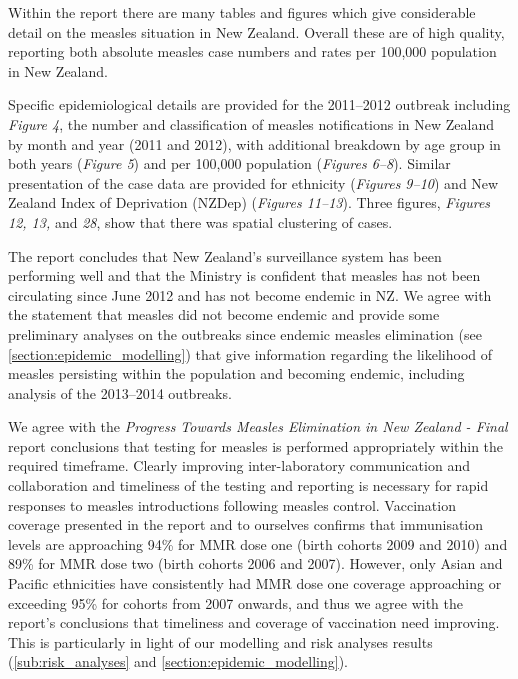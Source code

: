 \documentclass{article}
\begin{document}
Within the report there are many tables and figures which give considerable detail on the measles situation in New Zealand. Overall these are of high quality, reporting both absolute measles case numbers and rates per 100,000 population in New Zealand.

Specific epidemiological details are provided for the 2011--2012 outbreak including \emph{Figure 4}, the number and classification of measles notifications in New Zealand by month and year (2011 and 2012), with additional breakdown by age group in both years (\emph{Figure 5}) and per 100,000 population (\emph{Figures 6--8}). Similar presentation of the case data are provided for ethnicity (\emph{Figures 9--10}) and New Zealand Index of Deprivation (NZDep) (\emph{Figures 11--13}). Three figures, \emph{Figures 12, 13,} and \emph{28}, show that there was spatial clustering of cases.

The report concludes that New Zealand's surveillance system has been performing well and that the Ministry is confident that measles has not been circulating since June 2012 and has not become endemic in NZ. We agree with the statement that measles did not become endemic and provide some preliminary analyses on the outbreaks since endemic measles elimination (see \autoref{section:epidemic_modelling}) that give information regarding the likelihood of measles persisting within the population and becoming endemic, including analysis of the 2013--2014 outbreaks.

We agree with the \emph {Progress Towards Measles Elimination in New Zealand - Final} report conclusions that testing for measles is performed appropriately within the required timeframe. Clearly improving inter-laboratory communication and collaboration and timeliness of the testing and reporting is necessary for rapid responses to measles introductions following measles control. Vaccination coverage presented in the report and to ourselves confirms that immunisation levels are approaching 94\% for MMR dose one (birth cohorts 2009 and 2010) and 89\% for MMR dose two (birth cohorts 2006 and 2007). However, only Asian and Pacific ethnicities have consistently had MMR dose one coverage approaching or exceeding 95\% for cohorts from 2007 onwards, and thus we agree with the report's conclusions that timeliness and coverage of vaccination need improving. This is particularly in light of our modelling and risk analyses results (\autoref{sub:risk_analyses} and \autoref{section:epidemic_modelling}).
\end{document}
